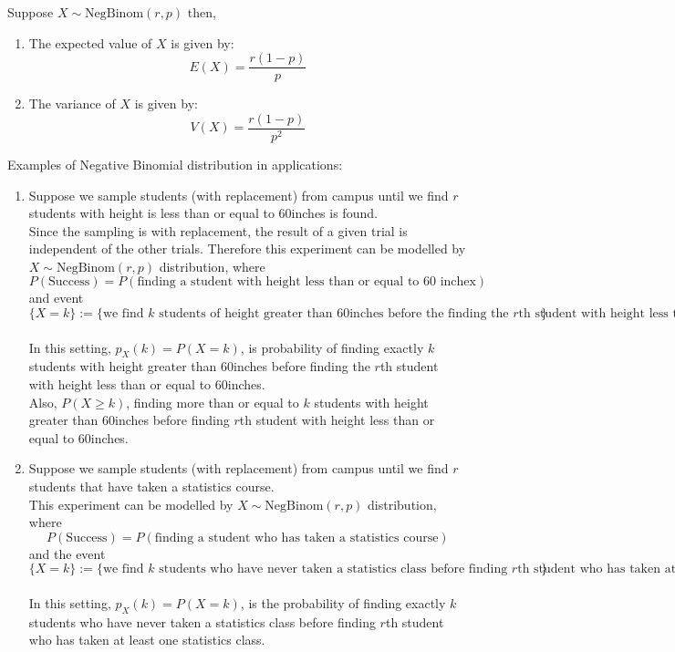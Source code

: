 \begin{thm}
    Suppose $X\sim \text{NegBinom}(r, p)$ then,
    \begin{enumerate}
        \item The expected value of $X$ is given by:
        $$E(X) = \frac{r(1-p)}{p}$$
        \item The variance of $X$ is given by:
        $$V(X) = \frac{r(1-p)}{p^2}$$
    \end{enumerate}
\end{thm}


Examples of Negative Binomial distribution in applications:
\begin{enumerate}
    \item Suppose we sample students (with replacement) from campus until we find $r$ students with height is less than or equal to 60inches is found. 
    \\
    Since the sampling is with replacement, the result of a given trial is independent of the other trials. Therefore this experiment can be modelled by $X\sim \text{NegBinom}(r, p)$ distribution, where $$P(\text{Success}) = P(\text{finding a student with height less than or equal to 60 inchex})$$ 
    and  event
    $$\{X= k \} := \{\text{we find $k$ students of height greater than 60inches before the finding the $r$th student with height less than or equal to 60 inches}\}$$
    \\
    In this setting, $p_X(k) = P(X=k)$, is probability of finding exactly $k$ students with height greater than 60inches before finding the $r$th student with height less than or equal to 60inches.  
    \\
    Also, $P(X \ge k)$, finding more than or equal to $k$ students with height greater than 60inches before finding $r$th student with height less than or equal to 60inches.
    \item  Suppose we sample students (with replacement) from campus until we find $r$ students that have taken a statistics course. 
    \\
    This experiment can be modelled by $X\sim \text{NegBinom}(r, p)$ distribution, 
    where
    $$P(\text{Success}) = P(\text{finding a student who has taken a statistics course})$$
    and the event 
    $$\{X= k \} := \{\text{we find $k$ students who have never taken a statistics class before finding $r$th student who has taken at least one statistics class}\}$$
    \\
    In this setting, $p_X(k) = P(X=k)$,  is the probability of finding exactly $k$ students who have never taken a statistics class before finding $r$th student who has taken at least one statistics class. 
    

\end{enumerate}
